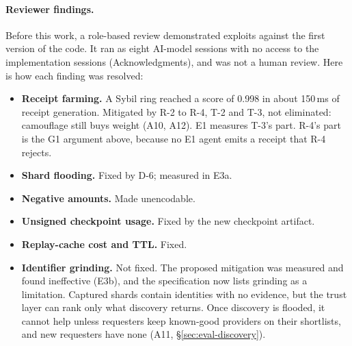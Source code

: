 \paragraph{Reviewer findings.}
Before this work, a role-based review demonstrated exploits against the
first version of the code. It ran as eight AI-model sessions with no
access to the implementation sessions (Acknowledgments), and was not a
human review. Here is how each finding was resolved:
\begin{itemize}
\item \textbf{Receipt farming.} A Sybil ring reached a score of 0.998 in
  about 150\,ms of receipt generation. Mitigated by R-2 to R-4, T-2 and
  T-3, not eliminated: camouflage still buys weight (A10, A12).
  E1 measures T-3's part. R-4's part is the G1 argument above, because
  no E1 agent emits a receipt that R-4 rejects.
\item \textbf{Shard flooding.} Fixed by D-6; measured in E3a.
\item \textbf{Negative amounts.} Made unencodable.
\item \textbf{Unsigned checkpoint usage.} Fixed by the new checkpoint
  artifact.
\item \textbf{Replay-cache cost and TTL.} Fixed.
\item \textbf{Identifier grinding.} Not fixed. The proposed mitigation
  was measured and found ineffective (E3b), and the specification now
  lists grinding as a limitation. Captured shards contain identities with
  no evidence, but the trust layer can rank only what discovery returns.
  Once discovery is flooded, it cannot help unless requesters keep
  known-good providers on their shortlists, and new requesters have none
  (A11, \S\ref{sec:eval-discovery}).
\end{itemize}

